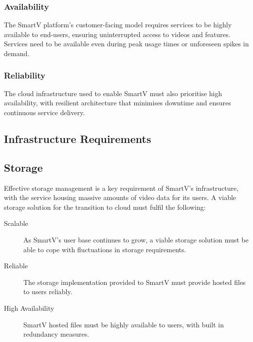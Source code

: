 \documentclass[]{article}
\begin{document}
\subsubsection{Availability}

The SmartV platform's customer-facing model requires services to be highly available to end-users, ensuring uninterrupted access to videos and features. Services need to be available even during peak usage times or unforeseen spikes in demand.


\subsubsection{Reliability}

The cloud infrastructure used to enable SmartV must also prioritise high availability, with resilient architecture that minimises downtime and ensures continuous service delivery. 

\subsection{Infrastructure Requirements}


\subsection{Storage}

Effective storage management is a key requirement of SmartV's infrastructure, with the service housing massive amounts of video data for its users. A viable storage solution for the transition to cloud must fulfil the following:

\begin{description}
    \item[Scalable] As SmartV's user base continues to grow, a viable storage solution must be able to cope with fluctuations in storage requirements.
    \item[Reliable] The storage implementation provided to SmartV must provide hosted files to users reliably.
    \item[High Availability] SmartV hosted files must be highly available to users, with built in redundancy measures.
\end{description}
\end{document}
